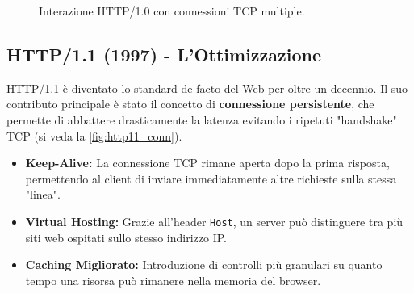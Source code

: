 \documentclass[11pt,a4paper]{report}
\begin{document}
\begin{figure}[ht]
\centering
{}
\caption{Interazione HTTP/1.0 con connessioni TCP multiple.}
\label{fig:http10_conn}
\end{figure}

\subsection{HTTP/1.1 (1997) - L'Ottimizzazione}
HTTP/1.1 è diventato lo standard de facto del Web per oltre un decennio. Il suo contributo principale è stato il concetto di \textbf{connessione persistente}, che permette di abbattere drasticamente la latenza evitando i ripetuti "handshake" TCP (si veda la \cref{fig:http11_conn}).

\begin{itemize}
    \item \textbf{Keep-Alive:} La connessione TCP rimane aperta dopo la prima risposta, permettendo al client di inviare immediatamente altre richieste sulla stessa "linea".
    \item \textbf{Virtual Hosting:} Grazie all'header \texttt{Host}, un server può distinguere tra più siti web ospitati sullo stesso indirizzo IP.
    \item \textbf{Caching Migliorato:} Introduzione di controlli più granulari su quanto tempo una risorsa può rimanere nella memoria del browser.
\end{itemize}
\end{document}

